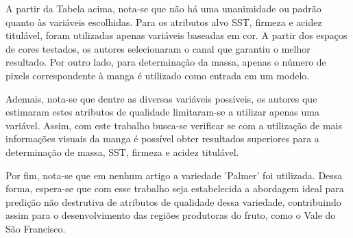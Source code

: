 A partir da Tabela acima, nota-se que não há uma unanimidade ou padrão quanto às variáveis escolhidas. Para os atributos alvo SST, firmeza e acidez titulável, foram utilizadas apenas variáveis baseadas em cor. A partir dos espaços de cores testados, os autores selecionaram o canal que garantiu o melhor resultado. Por outro lado, para determinação da massa, apenas o número de pixels correspondente à manga é utilizado como entrada em um modelo. 

Ademais, nota-se que dentre as diversas variáveis possíveis, os autores que estimaram estes atributos de qualidade limitaram-se a utilizar apenas uma variável. Assim, com este trabalho busca-se verificar se com a utilização de mais informações visuais da manga é possível obter resultados superiores para a determinação de massa, SST, firmeza e acidez titulável. 

Por fim, nota-se que em nenhum artigo a variedade 'Palmer' foi utilizada. Dessa forma, espera-se que com esse trabalho seja estabelecida a abordagem ideal para predição não destrutiva de atributos de qualidade dessa variedade, contribuindo assim para o desenvolvimento das regiões produtoras do fruto, como o Vale do São Francisco.